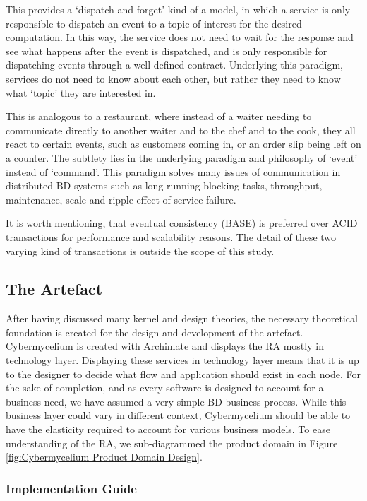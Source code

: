 \documentclass[review]{elsarticle}
\begin{document}
This provides a `dispatch and forget' kind of a model, in which a service is only responsible to dispatch an event to a topic of interest for the desired computation. In this way, the service does not need to wait for the response and see what happens after the event is dispatched, and is only responsible for dispatching events through a well-defined contract. Underlying this paradigm, services do not need to know about each other, but rather they need to know what `topic' they are interested in.

This is analogous to a restaurant, where instead of a waiter needing to communicate directly to another waiter and to the chef and to the cook, they all react to certain events, such as customers coming in, or an order slip being left on a counter. The subtlety lies in the underlying paradigm and philosophy of `event' instead of `command'. This paradigm solves many issues of communication in distributed BD systems such as long running blocking tasks, throughput, maintenance, scale and ripple effect of service failure.

It is worth mentioning, that eventual consistency (BASE) is preferred over ACID transactions for performance and scalability reasons. The detail of these two varying kind of transactions is outside the scope of this study.

\subsection{The Artefact} \label{the-artifact}

After having discussed many kernel and design theories, the necessary theoretical foundation is created for the design and development of the artefact. Cybermycelium is created with Archimate and displays the RA mostly in technology layer. Displaying these services in technology layer means that it is up to the designer to decide what flow and application should exist in each node. For the sake of completion, and as every software is designed to account for a business need, we have assumed a very simple BD business process. While this business layer could vary in different context, Cybermycelium should be able to have the elasticity required to account for various business models. To ease understanding of the RA, we sub-diagrammed the product domain in Figure \ref{fig:Cybermycelium Product Domain Design}.


\subsubsection{Implementation Guide}
\end{document}
